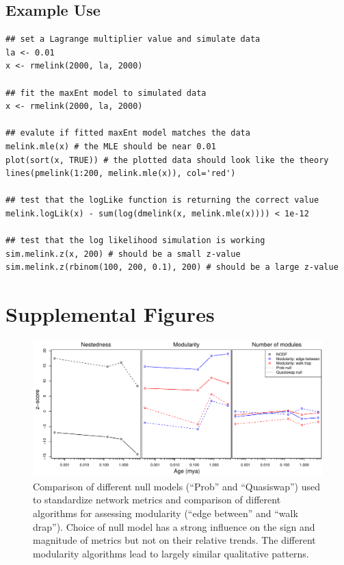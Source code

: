 \subsection{Example Use}

\begin{verbatim}
## set a Lagrange multiplier value and simulate data
la <- 0.01
x <- rmelink(2000, la, 2000)

## fit the maxEnt model to simulated data
x <- rmelink(2000, la, 2000)

## evalute if fitted maxEnt model matches the data
melink.mle(x) # the MLE should be near 0.01
plot(sort(x, TRUE)) # the plotted data should look like the theory
lines(pmelink(1:200, melink.mle(x)), col='red')

## test that the logLike function is returning the correct value
melink.logLik(x) - sum(log(dmelink(x, melink.mle(x)))) < 1e-12

## test that the log likelihood simulation is working
sim.melink.z(x, 200) # should be a small z-value
sim.melink.z(rbinom(100, 200, 0.1), 200) # should be a large z-value
\end{verbatim}

\printbibliography[heading=subbibliography]

\clearpage

\section*{Supplemental Figures}

\begin{figure}[!hp]
  \centering
  \includegraphics[scale=0.6]{figs/figSupp_netMetComp.pdf}
  \caption[Comparison of different null models]{Comparison of
    different null models (``Prob'' and ``Quasiswap'') used to
    standardize network metrics and comparison of different algorithms
    for assessing modularity (``edge between'' and ``walk
    drap''). Choice of null model has a strong influence on the sign
    and magnitude of metrics but not on their relative trends. The
    different modularity algorithms lead to largely similar
    qualitative patterns.}
  \label{figSupp:netMetComp}
\end{figure}

